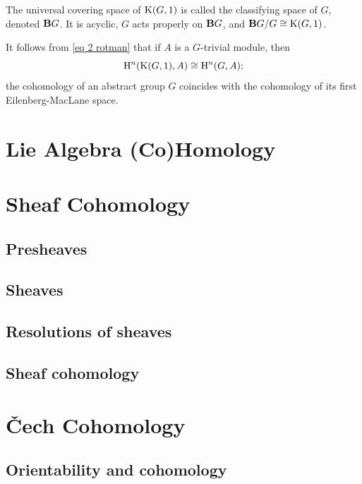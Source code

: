 \begin{defn}
    The universal covering space of $\rmK(G,1)$ is called the classifying space of $G$, denoted $\bf{B}G$. It is acyclic, $G$ acts properly on $\bf{B}G$, and $\bf{B}G\slash G\cong \rmK(G,1)$.
\end{defn}

It follows from \eqref{eq 2 rotman} that if $A$ is a $G$-trivial module, then
\[\rmH^n(\rmK(G,1),A)\cong \rmH^n(G,A);\]
the cohomology of an abstract group $G$ coincides with the cohomology of its first Eilenberg-MacLane space.



\chapter{Lie Algebra (Co)Homology \texorpdfstring{\ucmark}{}}






\chapter{Sheaf Cohomology \texorpdfstring{\ucmark}{}}
\section{Presheaves}

\section{Sheaves}

\section{Resolutions of sheaves}

\section{Sheaf cohomology}




\chapter{\v Cech Cohomology \texorpdfstring{\ucmark}{}}

\section{Orientability and cohomology}

